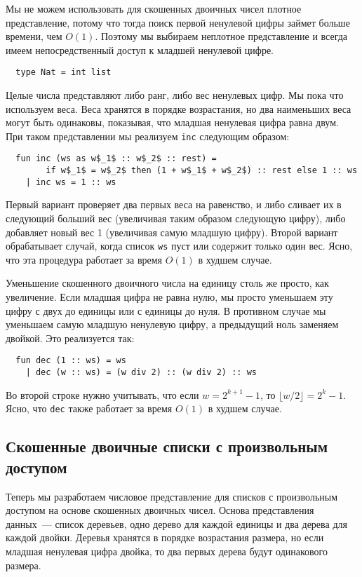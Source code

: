 Мы не можем использовать для скошенных двоичных чисел плотное
представление, потому что тогда поиск первой ненулевой цифры займет
больше времени, чем $O(1)$. Поэтому мы выбираем неплотное
представление и всегда имеем непосредственный доступ к младшей
ненулевой цифре.
\begin{lstlisting}
  type Nat = int list
\end{lstlisting}
Целые числа представляют либо ранг, либо вес ненулевых цифр. Мы пока
что используем веса. Веса хранятся в порядке возрастания, но два
наименьших веса могут быть одинаковы, показывая, что младшая ненулевая
цифра равна двум. При таком представлении мы реализуем \lstinline!inc!
следующим образом:
\begin{lstlisting}
  fun inc (ws as w$_1$ :: w$_2$ :: rest) =
        if w$_1$ = w$_2$ then (1 + w$_1$ + w$_2$) :: rest else 1 :: ws
    | inc ws = 1 :: ws
\end{lstlisting}
Первый вариант проверяет два первых веса на равенство, и либо сливает
их в следующий больший вес (увеличивая таким образом следующую цифру),
либо добавляет новый вес 1 (увеличивая самую младшую цифру). Второй
вариант обрабатывает случай, когда список \lstinline!ws! пуст или
содержит только один вес. Ясно, что эта процедура работает за время
$O(1)$ в худшем случае.

Уменьшение скошенного двоичного числа на единицу столь же просто, как
увеличение. Если младшая цифра не равна нулю, мы просто уменьшаем эту
цифру с двух до единицы или с единицы до нуля. В противном случае мы
уменьшаем самую младшую ненулевую цифру, а предыдущий ноль заменяем
двойкой. Это реализуется так:
\begin{lstlisting}
  fun dec (1 :: ws) = ws
    | dec (w :: ws) = (w div 2) :: (w div 2) :: ws
\end{lstlisting}
Во второй строке нужно учитывать, что если $w = 2^{k+1} - 1$, то
$\lfloor w/2 \rfloor = 2^k - 1$. Ясно, что \lstinline!dec! также
работает за время $O(1)$ в худшем случае.

\subsection{Скошенные двоичные списки с произвольным доступом}
\label{sc:9.3.1}

Теперь мы разработаем числовое представление для списков с
произвольным доступом на основе скошенных двоичных чисел.  Основа
представления данных~--- список деревьев, одно дерево для каждой
единицы и два дерева для каждой двойки. Деревья хранятся в порядке
возрастания размера, но если младшая ненулевая цифра двойка, то два
первых дерева будут одинакового размера.

